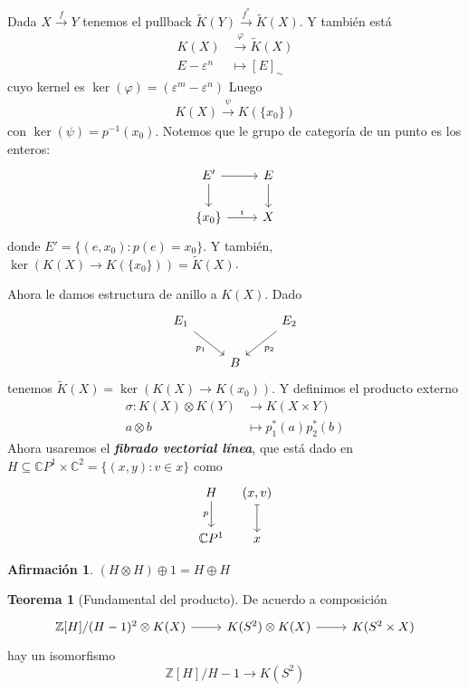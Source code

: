 \documentclass[spanish]{book}
\theoremstyle{definition}
\newtheorem*{teo}{Teorema}
\newtheorem*{af}{Afirmación}
\newcommand{\Z}{\mathbb{Z}}
\newcommand{\C}{\mathbb{C}}
\begin{document}
	Dada $X\overset{f}{\to}Y$ tenemos el pullback $\tilde{K}(Y)\overset{f^*}{\to}\tilde{K}(X)$. Y también está
	\begin{align*}
		K(X)&\overset{\varphi}{\to}\tilde{K}(X)\\
		E-\varepsilon^n&\mapsto [E]_\sim
	\end{align*}
	cuyo kernel es $\ker(\varphi)=(\varepsilon^m-\varepsilon^n)$
	Luego
	\begin{align*}
		K(X)\overset{\psi}{\to}K(\{x_0\})
	\end{align*}
	con $\ker(\psi)=p^{-1}(x_0)$. Notemos que le grupo de categoría de un punto es los enteros:
	\[\begin{tikzcd}
		E'\arrow[r]\arrow[d]&E\arrow[d]\\
		\{x_0\}\arrow[r,"i"]&X
	\end{tikzcd}\]
	donde $E'=\{(e,x_0):p(e)=x_0\}$. Y también, $\ker(K(X)\to K(\{x_0\}))=\tilde{K}(X)$.

Ahora le damos estructura de anillo a $K(X)$. Dado
	\[\begin{tikzcd}
	E_1\arrow[rd,swap,"p_1"]&&E_2\arrow[ld,"p_2"]\\
	&B
\end{tikzcd}\]
tenemos $\tilde{K}(X)=\ker(K(X)\to K(x_0))$. Y definimos el producto externo
\begin{align*}
	\sigma:K(X)\otimes K(Y)&\to K(X\times Y)\\
	a\otimes b&\mapsto p_1^*(a)p_2^*(b)
\end{align*}
Ahora usaremos el \textbf{\textit{fibrado vectorial línea}}, que está dado en $H\subseteq \C P^1\times \C^2=\{(x,y):v\in x\}$ como
\[\begin{tikzcd}[column sep=tiny]
	H\arrow[d,swap,"p"]&(x,v)\arrow[d,maps to]\\
	\C P^1&x
\end{tikzcd}\]
\begin{af}
	$(H\otimes H)\oplus1=H\oplus H$
\end{af}
\begin{teo}[Fundamental del producto]
	De acuerdo a composición
	\[\begin{tikzcd}
			\Z[H]/(H-1)^2\otimes K(X)\arrow[r]&K(S^2)\otimes K(X)\arrow[r]&K(S^2\times X)
	\end{tikzcd}\]
	hay un isomorfismo
	\[\Z[H]/H-1\to K(S^2)\]
\end{teo}
\end{document}

